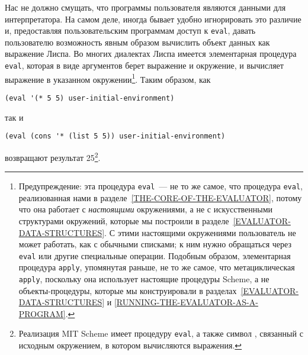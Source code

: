 Нас не должно смущать, что программы пользователя являются
данными для интерпретатора.  На самом деле, иногда бывает удобно
игнорировать это различие и, предоставляя пользовательским программам
доступ к {\tt eval}, давать пользователю возможность явным
образом вычислить объект данных как выражение Лиспа.  Во многих диалектах
Лиспа имеется элементарная процедура {\tt eval},
которая в виде
аргументов берет выражение и окружение, и вычисляет выражение в
указанном окружении\footnote{Предупреждение: эта процедура {\tt eval}~--- не то
же самое, что процедура {\tt eval},
реализованная нами в
разделе~\ref{THE-CORE-OF-THE-EVALUATOR}, потому что она
работает с {\em настоящими} окружениями, а не с искусственными
структурами окружений, которые мы построили в 
разделе~\ref{EVALUATOR-DATA-STRUCTURES}. С этими
настоящими окружениями пользователь не может работать, как с обычными
списками; к ним нужно обращаться через {\tt eval} или
другие специальные операции.  Подобным образом, элементарная процедура
{\tt apply}, упомянутая раньше, не то же самое, что
метациклическая {\tt apply}, поскольку она использует настоящие
процедуры Scheme, а не объекты-процедуры, которые мы конструировали в
разделах~\ref{EVALUATOR-DATA-STRUCTURES} и
\ref{RUNNING-THE-EVALUATOR-AS-A-PROGRAM}.}.
Таким образом, как

\begin{Verbatim}[fontsize=\small]
(eval '(* 5 5) user-initial-environment)
\end{Verbatim}
так и

\begin{Verbatim}[fontsize=\small]
(eval (cons '* (list 5 5)) user-initial-environment)
\end{Verbatim}
возвращают результат 25\footnote{Реализация MIT Scheme имеет процедуру
{\tt eval},
а также символ 
, связанный с исходным
окружением, в котором вычисляются выражения.}.

